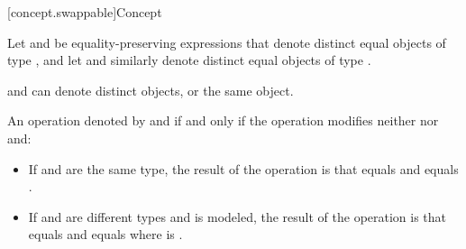 [concept.swappable]{Concept }

\pnum
Let  and  be equality-preserving expressions that denote
distinct equal objects of type , and let  and 
similarly denote distinct equal objects of type .
\begin{note}
 and  can denote distinct objects, or the same object.
\end{note}
An operation
 denoted by  and  if and only
if the operation modifies neither  nor  and:
\begin{itemize}
\item If  and  are the same type, the result of the operation
  is that  equals  and  equals .

\item If  and  are different types and
  is modeled,
  the result of the operation is that
   equals 
  and
   equals 
  where  is .
\end{itemize}

